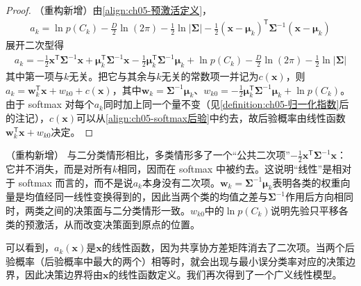 \documentclass[../../main.tex]{subfiles}
\begin{document}
\begin{proof}
（重构新增）由\eqref{align:ch05-预激活定义}，
\begin{align}
  a_k=\ln p(C_k)-\frac{D}{2}\ln(2\pi)-\frac{1}{2}\ln\lvert\boldsymbol{\Sigma}\rvert-\frac{1}{2}(\boldsymbol{x}-\boldsymbol{\mu}_k)^{\mathsf{T}}\boldsymbol{\Sigma}^{-1}(\boldsymbol{x}-\boldsymbol{\mu}_k)
\end{align}
展开二次型得
\begin{align}
  a_k=-\frac{1}{2}\boldsymbol{x}^{\mathsf{T}}\boldsymbol{\Sigma}^{-1}\boldsymbol{x}+\boldsymbol{\mu}_k^{\mathsf{T}}\boldsymbol{\Sigma}^{-1}\boldsymbol{x}-\frac{1}{2}\boldsymbol{\mu}_k^{\mathsf{T}}\boldsymbol{\Sigma}^{-1}\boldsymbol{\mu}_k+\ln p(C_k)-\frac{D}{2}\ln(2\pi)-\frac{1}{2}\ln\lvert\boldsymbol{\Sigma}\rvert
\end{align}
其中第一项与$k$无关。把它与其余与$k$无关的常数项一并记为$c(\boldsymbol{x})$，则$a_k=\boldsymbol{w}_k^{\mathsf{T}}\boldsymbol{x}+w_{k0}+c(\boldsymbol{x})$，其中$\boldsymbol{w}_k=\boldsymbol{\Sigma}^{-1}\boldsymbol{\mu}_k$、$w_{k0}=-\frac{1}{2}\boldsymbol{\mu}_k^{\mathsf{T}}\boldsymbol{\Sigma}^{-1}\boldsymbol{\mu}_k+\ln p(C_k)$。由于 softmax 对每个$a_k$同时加上同一个量不变（见\cref{definition:ch05-归一化指数}后的注记），$c(\boldsymbol{x})$可以从\eqref{align:ch05-softmax后验}中约去，故后验概率由线性函数$\boldsymbol{w}_k^{\mathsf{T}}\boldsymbol{x}+w_{k0}$决定。
\end{proof}

\begin{remark}（重构新增）
与二分类情形相比，多类情形多了一个“公共二次项”$-\frac{1}{2}\boldsymbol{x}^{\mathsf{T}}\boldsymbol{\Sigma}^{-1}\boldsymbol{x}$：它并不消失，而是对所有$k$相同，因而在 softmax 中被约去。这说明“线性”是相对于 softmax 而言的，而不是说$a_k$本身没有二次项。$\boldsymbol{w}_k=\boldsymbol{\Sigma}^{-1}\boldsymbol{\mu}_k$表明各类的权重向量是均值经同一线性变换得到的，因此当两个类的均值之差与$\boldsymbol{\Sigma}^{-1}$作用后方向相同时，两类之间的决策面与二分类情形一致。$w_{k0}$中的$\ln p(C_k)$说明先验只平移各类的预激活，从而改变决策面到原点的位置。
\end{remark}

可以看到，$a_k(\boldsymbol{x})$是$\boldsymbol{x}$的线性函数，因为共享协方差矩阵消去了二次项。当两个后验概率（后验概率中最大的两个）相等时，就会出现与最小误分类率对应的决策边界，因此决策边界将由$\boldsymbol{x}$的线性函数定义。我们再次得到了一个广义线性模型。
\end{document}

